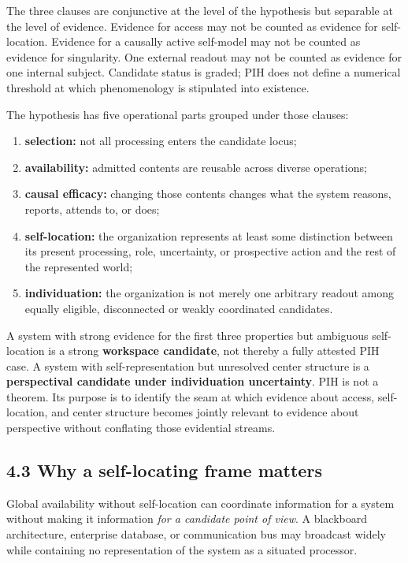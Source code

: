 \documentclass[
  11pt,
]{article}
\providecommand{\tightlist}{%
  \setlength{\itemsep}{0pt}\setlength{\parskip}{0pt}}
\begin{document}
The three clauses are conjunctive at the level of the hypothesis but
separable at the level of evidence. Evidence for access may not be
counted as evidence for self-location. Evidence for a causally active
self-model may not be counted as evidence for singularity. One external
readout may not be counted as evidence for one internal subject.
Candidate status is graded; PIH does not define a numerical threshold at
which phenomenology is stipulated into existence.

The hypothesis has five operational parts grouped under those clauses:

\begin{enumerate}
\def\labelenumi{\arabic{enumi}.}
\tightlist
\item
  \textbf{selection:} not all processing enters the candidate locus;
\item
  \textbf{availability:} admitted contents are reusable across diverse
  operations;
\item
  \textbf{causal efficacy:} changing those contents changes what the
  system reasons, reports, attends to, or does;
\item
  \textbf{self-location:} the organization represents at least some
  distinction between its present processing, role, uncertainty, or
  prospective action and the rest of the represented world;
\item
  \textbf{individuation:} the organization is not merely one arbitrary
  readout among equally eligible, disconnected or weakly coordinated
  candidates.
\end{enumerate}

A system with strong evidence for the first three properties but
ambiguous self-location is a strong \textbf{workspace candidate}, not
thereby a fully attested PIH case. A system with self-representation but
unresolved center structure is a \textbf{perspectival candidate under
individuation uncertainty}. PIH is not a theorem. Its purpose is to
identify the seam at which evidence about access, self-location, and
center structure becomes jointly relevant to evidence about perspective
without conflating those evidential streams.

\subsection{4.3 Why a self-locating frame
matters}\label{why-a-self-locating-frame-matters}

Global availability without self-location can coordinate information for
a system without making it information \emph{for a candidate point of
view}. A blackboard architecture, enterprise database, or communication
bus may broadcast widely while containing no representation of the
system as a situated processor.
\end{document}
